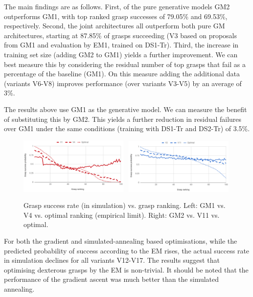 The main findings are as follows. First, of the pure generative models GM2 outperforms GM1, with top ranked grasp successes of 79.05\% and 69.53\%, respectively. Second, the joint architectures all outperform both pure GM architectures, starting at 87.85\% of grasps succeeding (V3 based on proposals from GM1 and evaluation by EM1, trained on DS1-Tr). Third, the increase in training set size (adding GM2 to GM1) yields a further improvement. We can best measure this by considering the residual number of top grasps that fail as a percentage of the baseline (GM1). On this measure adding the additional data (variants V6-V8) improves performance (over variants V3-V5) by an average of 3\%. 

The results above use GM1 as the generative model. We can measure the benefit of substituting this by GM2. This yields a further reduction in residual failures over GM1 under the same conditions (training with DS1-Tr and DS2-Tr) of 3.5\%.

\begin{figure}[t]
\begin{center}
\includegraphics[width=0.48\textwidth]{images/svr_gm1}~
\includegraphics[width=0.48\textwidth]{images/svr_gm2}
\caption{Grasp success rate (in simulation) vs. grasp ranking. Left: GM1 vs. V4 vs. optimal ranking (empirical limit). Right: GM2 vs. V11 vs. optimal.\label{fig:successvsranking}}
\end{center}
\end{figure}


For both the gradient and simulated-annealing based optimisations, while the predicted probability of success according to the EM rises, the actual success rate in simulation declines for all variants V12-V17. The results suggest that optimising dexterous grasps by the EM is non-trivial. It should be noted that the performance of the gradient ascent was much better than the simulated annealing.

